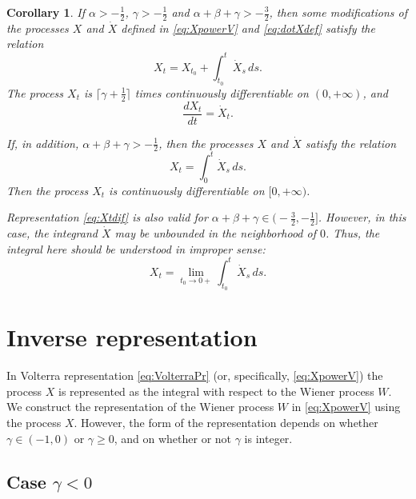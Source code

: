 \documentclass{article}
\newcommand{\dotX}{\dot{X}}
\theoremstyle{plain}
\newtheorem{corollary}{Corollary}
\theoremstyle{remark}
\theoremstyle{definition}
\begin{document}
\begin{corollary}\label{corollary:dXdt}
If $\alpha>-\frac12$, $\gamma>-\frac12$ and $\alpha+\beta+\gamma>-\frac32$,
then some modifications of the processes $X$ and $\dotX$ defined in
\eqref{eq:XpowerV} and \eqref{eq:dotXdef} satisfy
the relation
\[
	X_t = X_{t_0} + \int_{t_0}^t \dotX_s \, ds.
\]
The process $X_t$ is $\lceil\gamma+\frac12\rceil$ times
	continuously differentiable on $(0,{+}\infty)$,
	and
	\begin{equation}\label{eq:dXtdXt}
		\frac{d X_t}{dt} = \dotX_t.
	\end{equation}

If, in addition, $\alpha+\beta+\gamma>-\frac12$,  then
the processes $X$ and $\dotX$ satisfy the relation
\begin{equation}\label{eq:Xtdif}
X_t = \int_0^t \dotX_s \, ds.
\end{equation}
Then the process $X_t$ is continuously differentiable on $[0,{+}\infty)$.

Representation \eqref{eq:Xtdif} is also valid for
$\alpha+\beta+\gamma \in \bigl(-\frac32, -\frac12\bigr]$.
However, in this case, the integrand $\dotX$ may be unbounded
in the neighborhood of $0$.  Thus,
the integral here should be understood in improper sense:
	\[
		X_t = \lim_{t_0\to 0+} \int_{t_0}^t \dotX_s \, ds.
	\]
\end{corollary}




\section{Inverse representation}
In Volterra representation \eqref{eq:VolterraPr}
(or, specifically, \eqref{eq:XpowerV})
the process $X$ is represented as the integral
with respect to the Wiener process $W$.
We construct the representation
of the Wiener process $W$ in \eqref{eq:XpowerV}
using the process $X$.
However, the form of the representation
depends on whether $\gamma\in(-1,0)$
or $\gamma\ge 0$, and on whether or not $\gamma$ is integer.


\subsection[Case $\gamma<0$]{Case \boldmath$\gamma<0$}
\end{document}
